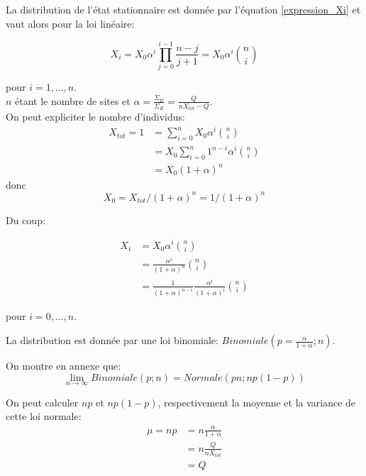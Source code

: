 La distribution de l'état stationnaire est donnée par l'équation \ref{expression_Xi} et vaut alors pour la loi linéaire:

\begin{equation}
X_i=X_0 \alpha^i \prod_{j=0}^{i-1} \frac{n-j}{j+1} =X_0 \alpha^i \binom{n}{i}
\end{equation}

pour $i=1,...,n$. \\

$n$ étant le nombre de sites et $\alpha = \frac{\Sigma_D}{\Sigma_R} = \frac{Q}{nX_{tot}-Q}$.\\

On peut expliciter le nombre d'individus:
\begin{equation}
\begin{aligned}
X_{tot}=1&=\sum_{i=0}^{n}X_0\alpha^i\binom{n}{i}\\
		&= X_0 \sum_{i=0}^n1^{n-i}\alpha^i\binom{n}{i}\\
		&= X_0 (1+\alpha)^n 
\end{aligned}
\end{equation}
donc
\begin{equation}
X_0 = X_{tot}/(1+\alpha)^n=1/(1+\alpha)^n
\end{equation}

Du coup:

\begin{equation}
\begin{aligned}
X_i &= X_0 \alpha^i \binom{n}{i}\\
	&= \frac{\alpha^i}{(1+\alpha)^n} \binom{n}{i}\\
	&= \frac{1}{(1+\alpha)^{n-i}}\frac{\alpha^i}{(1+\alpha)^i}\binom{n}{i}
\end{aligned}
\end{equation}

pour $i=0,...,n$.

La distribution est donnée par une loi binomiale: $Binomiale(p=\frac{\alpha}{1+\alpha};n)$.

On montre en annexe que: $$\lim_{n\rightarrow\infty} Binomiale(p;n) = Normale(pn;np(1-p))$$

On peut calculer $np$ et $np(1-p)$, respectivement la moyenne et la variance de cette loi normale:
\begin{equation}
\begin{aligned}
\mu = np 	&= n \frac{\alpha}{1+\alpha}\\
	&= n \frac{Q}{nX_{tot}}\\
	&= Q\\
\end{aligned}
\end{equation}

